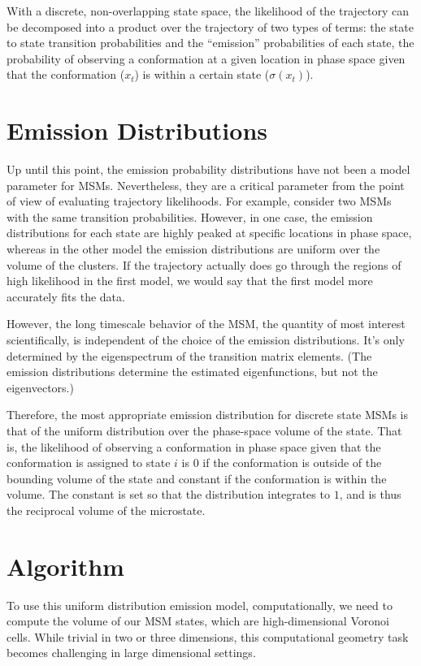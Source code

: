 \documentclass[twocolumn,floatfix,nofootinbib,aps]{revtex4-1}
\begin{document}
With a discrete, non-overlapping state space, the likelihood of the
trajectory can be decomposed into a product over the trajectory of two
types of terms: the state to state transition probabilities and the
``emission'' probabilities of each state, the probability of observing a
conformation at a given location in phase space given that the
conformation ($x_t$) is within a certain state ($\sigma(x_t)$).

\section{Emission Distributions}

Up until this point, the emission probability distributions have not
been a model parameter for MSMs. Nevertheless, they are a critical
parameter from the point of view of evaluating trajectory likelihoods.
For example, consider two MSMs with the same transition probabilities.
However, in one case, the emission distributions for each state are
highly peaked at specific locations in phase space, whereas in the other
model the emission distributions are uniform over the volume of the
clusters. If the trajectory actually does go through the regions of high
likelihood in the first model, we would say that the first model more
accurately fits the data.

However, the long timescale behavior of the MSM, the quantity of most
interest scientifically, is independent of the choice of the emission
distributions. It's only determined by the eigenspectrum of the
transition matrix elements. (The emission distributions determine the
estimated eigenfunctions, but not the eigenvectors.)

Therefore, the most appropriate emission distribution for discrete state
MSMs is that of the uniform distribution over the phase-space volume of
the state. That is, the likelihood of observing a conformation in phase
space given that the conformation is assigned to state $i$ is $0$
if the conformation is outside of the bounding volume of the state and
constant if the conformation is within the volume. The constant is set
so that the distribution integrates to $1$, and is thus the reciprocal
volume of the microstate.

\section{Algorithm}

To use this uniform distribution emission model, computationally, we
need to compute the volume of our MSM states, which are high-dimensional
Voronoi cells. While trivial in two or three dimensions, this
computational geometry task becomes challenging in large dimensional
settings.
\end{document}
